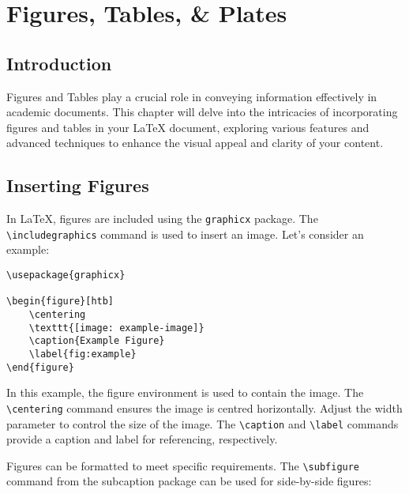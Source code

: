\chapter{Figures, Tables, \& Plates}

\section{Introduction}

Figures and Tables play a crucial role in conveying information effectively in academic documents. 
This chapter will delve into the intricacies of incorporating figures and tables in your LaTeX document, exploring various features and advanced techniques to enhance the visual appeal and clarity of your content.

\section{Inserting Figures}

In LaTeX, figures are included using the \texttt{graphicx} package. The \lstinline|\includegraphics| command is used to insert an image. 
Let's consider an example:

\begin{lstlisting}[float=h,caption=A Basic Example of Including a Figure.,label=lst:figureExample,style=LaTeXStyle,basicstyle=\small\ttfamily,]
\usepackage{graphicx}

\begin{figure}[htb]
    \centering
    \texttt{[image: example-image]}
    \caption{Example Figure}
    \label{fig:example}
\end{figure}
\end{lstlisting}

In this example, the figure environment is used to contain the image. The \lstinline|\centering| command ensures the image is centred horizontally. Adjust the width parameter to control the size of the image. The \lstinline|\caption| and \lstinline|\label| commands provide a caption and label for referencing, respectively.

Figures can be formatted to meet specific requirements. The \lstinline|\subfigure| command from the subcaption package can be used for side-by-side figures:

